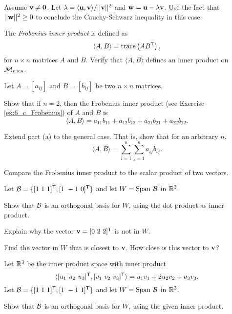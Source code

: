 \item Assume $\mathbf{v} \neq \mathbf{0}$. Let $\lambda= \langle \mathbf{u}, \mathbf{v} \rangle / ||\mathbf{v}||^2 $ and $\mathbf{w}=\mathbf{u} - \lambda \mathbf{v}$. Use the fact that $||\mathbf{w}||^2 \geq 0$ to conclude the Cauchy-Schwarz inequality in this case.
\ea

\item \label{ex:6_c_Frobenius} The \emph{Frobenius inner product} is defined as  
	\[\langle A, B \rangle = \text{trace}\left(AB^{\mathsf{T}}\right).\]
for $n \times n$ matrices $A$ and $B$. Verify that $\langle A, B \rangle$ defines an inner product on $\mathcal{M}_{n \times n}$. 

	
\item Let $A = [a_{ij}]$ and $B = [b_{ij}]$ be two $n \times n$ matrices. 
	\ba
	\item Show that if $n=2$, then the Frobenius inner product (see Exercise \ref{ex:6_c_Frobenius}) of $A$ and $B$ is 
	\[\langle A, B \rangle = a_{11}b_{11} + a_{12}b_{12} + a_{21}b_{21} + a_{22}b_{22}.\]
	
	\item Extend part (a) to the general case. That is, show that for an arbitrary $n$, 
	\[\langle A, B \rangle = \sum_{i=1}^n \sum_{j=1}^n a_{ij}b_{ij}.\]
	
	\item Compare the Frobenius inner product to the scalar product of two vectors. 
	
	\ea

	
\item  Let $\CB = \{[1 \ 1 \ 1]^{\tr}, [1 \ -1 \ 0]^{\tr}\}$ and let $W = \Span \ \CB$ in $\mathbb{R}^3$. 
   \ba
    \item Show that $\mathcal{B}$ is an orthogonal basis for $W$, using the dot product as inner product. 

    \item Explain why the vector $\vv = [0 \ 2 \ 2]^{\tr}$ is not in $W$.
    
    \item Find the vector in $W$ that is closest to $\mathbf{v}$. How close is this vector to $\mathbf{v}$?
    
    \ea 
    
\item  Let $\mathbb{R}^3$ be the inner product space with inner product
\[\langle [u_1 \ u_2 \ u_3]^{\mathsf{T}}, [v_1 \ v_2 \ v_3]^{\mathsf{T}}\rangle = u_1v_1 + 2u_2v_2 + u_3v_3.\]
Let $\CB = \{[1 \ 1 \ 1]^{\tr}, [1 \ -1 \ 1]^{\tr}\}$ and let $W = \Span \ \CB$ in $\mathbb{R}^3$. 
   \ba
    \item Show that $\mathcal{B}$ is an orthogonal basis for $W$, using the given inner product. 
    
